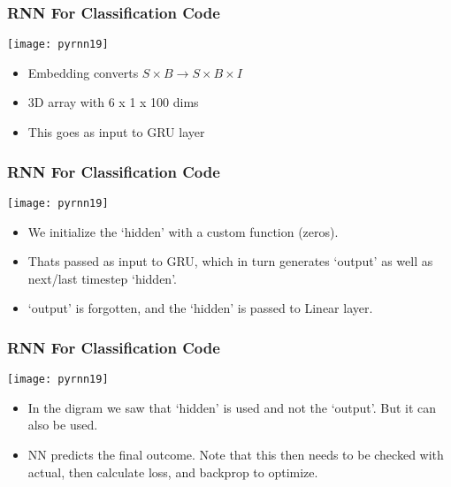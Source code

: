 \begin{frame}[fragile] \frametitle{RNN For Classification Code}
\begin{center}
\texttt{[image: pyrnn19]}
\end{center}
\begin{itemize}
\item Embedding converts $S \times B \rightarrow S \times B \times I $
\item 3D array with 6 x 1 x 100 dims
\item This goes as input to GRU layer
\end{itemize}
\end{frame}


\begin{frame}[fragile] \frametitle{RNN For Classification Code}
\begin{center}
\texttt{[image: pyrnn19]}
\end{center}
\begin{itemize}
\item We initialize the `hidden' with a custom function (zeros).
\item Thats passed as input to GRU, which in turn generates `output' as well as next/last timestep `hidden'.
\item `output' is forgotten, and the `hidden' is passed to Linear layer. 

\end{itemize}
\end{frame}

\begin{frame}[fragile] \frametitle{RNN For Classification Code}
\begin{center}
\texttt{[image: pyrnn19]}
\end{center}
\begin{itemize}
\item In the digram we saw that `hidden' is used and not the `output'. But it can also be used.
\item NN predicts the final outcome. Note that this then needs to be checked with actual, then calculate loss, and backprop to optimize.
\end{itemize}
\end{frame}

